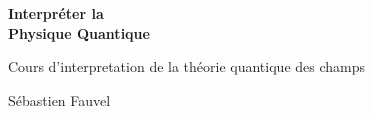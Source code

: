 \thispagestyle{empty}

\null

\vfill

\begin{center}

{\Huge \textbf{Interpréter la\\Physique Quantique}}

\vskip 1.2cm

Cours d'interpretation de la théorie quantique des champs

\vskip 2cm

{\large Sébastien Fauvel}

\end{center}

\vfill

\null
